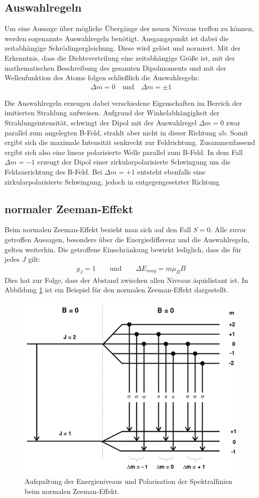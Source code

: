 \subsection{Auswahlregeln}
Um eine Aussage über mögliche Übergänge der neuen Niveaus treffen zu können, werden sogenannte Auswahlregeln benötigt. Ausgangspunkt ist dabei die zeitabhängige Schrödingergleichung. Diese wird gelöst und normiert. Mit der Erkenntnis, dass die Dichteverteilung eine zeitabhängige Größe ist, mit der mathematischen Beschreibung des gesamten Dipolmoments und mit der Wellenfunktion des Atoms folgen schließlich die Auswahlregeln:
\begin{align}
	\Delta m=0 \quad \text{und} \quad \Delta m=\pm1
\end{align}

Die Auswahlregeln erzeugen dabei verschiedene Eigenschaften im Bereich der imitierten Strahlung aufweisen. Aufgrund der Winkelabhängigkeit der Strahlungsintensität, schwingt der Dipol mit der Auswahlregel $\Delta m=0$ zwar parallel zum angelegten B-Feld, strahlt aber nicht in dieser Richtung ab. Somit ergibt sich die maximale Intensität senkrecht zur Feldrichtung. Zusammenfassend ergibt sich also eine linear polarisierte Welle parallel zum B-Feld. In dem Fall $\Delta m=-1$ erzeugt der Dipol einer zirkularpolarisierte Schwingung um die Feldausrichtung des B-Feld. Bei $\Delta m=+1$ entsteht ebenfalls eine zirkularpolarisierte Schwingung, jedoch in entgegengesetzter Richtung

\subsection{normaler Zeeman-Effekt}
Beim normalen Zeeman-Effekt bezieht man sich auf den Fall $S=0$. Alle zuvor getroffen Aussagen, besonders über die Energiedifferenz und die Auswahlregeln, gelten weiterhin. Die getroffene Einschränkung bewirkt lediglich, dass die für jedes $J$ gilt:
\begin{align}
	g_J=1 \qquad \text{und} \qquad \Delta E_{mag}=m\mu_B B
\end{align}
Dies hat zur Folge, dass der Abstand zwischen allen Niveaus äquidistant ist. In Abbildung \ref{fig:theorie_2} ist ein Beispiel für den normalen Zeeman-Effekt dargestellt.


\begin{figure}[H]
  \centering
  \includegraphics[width=.5\textwidth]{ressources/anomal.png}
  \caption{Aufspaltung der Energieniveaus und Polarisation der Spektrallinien beim normalen Zeeman-Effekt\cite{skript}.}
  \label{fig:theorie_2}
\end{figure}

